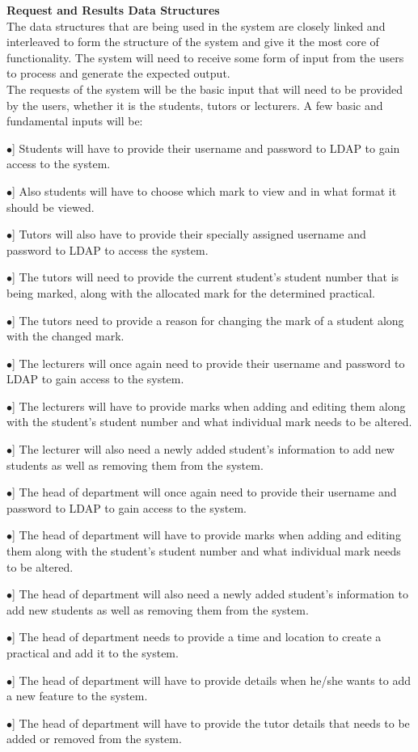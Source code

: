 \documentclass[12pt, a4paper]{scrartcl}
\newcommand{\tab}[1]{\hspace{.05\textwidth}\rlap{#1}}
\begin{document}
				\pagebreak
				\textbf{Request and Results Data Structures}\\
				The data structures that are being used in the system are closely linked and interleaved to form the structure of the system and give it the most core of functionality. The system will need to receive some form of input from the users to process and generate the expected output.\\
				The requests of the system will be the basic input that will need to be provided by the users, whether it is the students, tutors or lecturers. A few basic and fundamental inputs will be:
				\begin{description}
					\item \tab [$\bullet$] Students will have to provide their username and password to LDAP to gain access to the system.
					\item \tab [$\bullet$] Also students will have to choose which mark to view and in what format it should be viewed.
					\item \tab [$\bullet$] Tutors will also have to provide their specially assigned username and password to LDAP to access the system.
					\item \tab [$\bullet$] The tutors will need to provide the current student’s student number that is being marked, along with the allocated mark for the determined practical.
					\item \tab [$\bullet$] The tutors need to provide a reason for changing the mark of a student along with the changed mark.
					\item \tab [$\bullet$] The lecturers will once again need to provide their username and password to LDAP to gain access to the system.
					\item \tab [$\bullet$] The lecturers will have to provide marks when adding and editing them along with the student’s student number and what individual mark needs to be altered.
					\item \tab [$\bullet$] The lecturer will also need a newly added student’s information to add new students as well as removing them from the system.
					\item \tab [$\bullet$] The head of department will once again need to provide their username and password to LDAP to gain access to the system.
					\item \tab [$\bullet$] The head of department will have to provide marks when adding and editing them along with the student’s student number and what individual mark needs to be altered.
					\item \tab [$\bullet$] The head of department will also need a newly added student’s information to add new students as well as removing them from the system.
					\item \tab [$\bullet$] The head of department needs to provide a time and location to create a practical and add it to the system.
					\item \tab [$\bullet$] The head of department will have to provide details when he/she wants to add a new feature to the system.
					\item \tab [$\bullet$] The head of department will have to provide the tutor details that needs to be added or removed from the system.
				\end{description}
\end{document}
